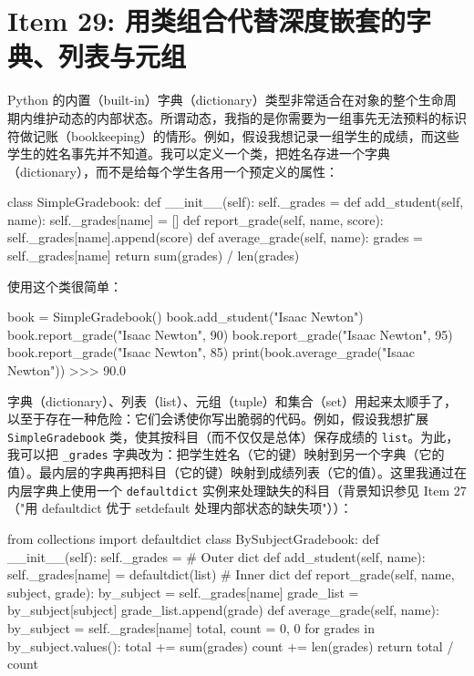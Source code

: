 \section{Item 29: 用类组合代替深度嵌套的字典、列表与元组}

Python 的内置（built-in）字典（dictionary）类型非常适合在对象的整个生命周期内维护动态的内部状态。所谓动态，我指的是你需要为一组事先无法预料的标识符做记账（bookkeeping）的情形。例如，假设我想记录一组学生的成绩，而这些学生的姓名事先并不知道。我可以定义一个类，把姓名存进一个字典（dictionary），而不是给每个学生各用一个预定义的属性：

\begin{codebox}[python]
class SimpleGradebook:
    def __init__(self):
        self._grades = {}
    def add_student(self, name):
        self._grades[name] = []
    def report_grade(self, name, score):
        self._grades[name].append(score)
    def average_grade(self, name):
        grades = self._grades[name]
        return sum(grades) / len(grades)
\end{codebox}

使用这个类很简单：

\begin{codebox}[python]
book = SimpleGradebook()
book.add_student("Isaac Newton")
book.report_grade("Isaac Newton", 90)
book.report_grade("Isaac Newton", 95)
book.report_grade("Isaac Newton", 85)
print(book.average_grade("Isaac Newton"))
>>>
90.0
\end{codebox}

字典（dictionary）、列表（list）、元组（tuple）和集合（set）用起来太顺手了，以至于存在一种危险：它们会诱使你写出脆弱的代码。例如，假设我想扩展 \texttt{SimpleGradebook} 类，使其按科目（而不仅仅是总体）保存成绩的 \texttt{list}。为此，我可以把 \texttt{\_grades} 字典改为：把学生姓名（它的键）映射到另一个字典（它的值）。最内层的字典再把科目（它的键）映射到成绩列表（它的值）。这里我通过在内层字典上使用一个 \texttt{defaultdict} 实例来处理缺失的科目（背景知识参见 Item 27（"用 defaultdict 优于 setdefault 处理内部状态的缺失项"））：

\begin{codebox}[python]
from collections import defaultdict
class BySubjectGradebook:
    def __init__(self):
        self._grades = {}                       # Outer dict
    def add_student(self, name):
        self._grades[name] = defaultdict(list)  # Inner dict
    def report_grade(self, name, subject, grade):
        by_subject = self._grades[name]
        grade_list = by_subject[subject]
        grade_list.append(grade)
    def average_grade(self, name):
        by_subject = self._grades[name]
        total, count = 0, 0
        for grades in by_subject.values():
            total += sum(grades)
            count += len(grades)
        return total / count
\end{codebox}

